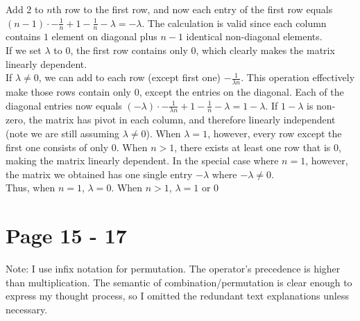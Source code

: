 \documentclass{article}
\begin{document}
Add $2$ to $n$th row to the first row, and now each entry of the first row equals $(n-1)\cdot -\frac{1}{n} + 1- \frac{1}{n}-\lambda=-\lambda$. The calculation is valid since each column contains $1$ element on diagonal plus $n-1$ identical non-diagonal elements.\\

If we set $\lambda$ to $0$, the first row contains only $0$, which clearly makes the matrix linearly dependent.\\

If $\lambda \neq 0$, we can add to each row (except first one) $-\frac{1}{\lambda n}$. This operation effectively make those rows contain only $0$, except the entries on the diagonal. Each of the diagonal entries now equals $(-\lambda)\cdot-\frac{1}{\lambda n} + 1 - \frac{1}{n} - \lambda = 1-\lambda$. If $1-\lambda$ is non-zero, the matrix has pivot in each column, and therefore linearly independent (note we are still assuming $\lambda \neq 0$). When $\lambda = 1$, however, every row except the first one consists of only $0$. When $n > 1$, there exists at least one row that is $0$, making the matrix linearly dependent. In the special case where $n=1$, however, the matrix we obtained has one single entry $-\lambda$ where $-\lambda \neq 0$.\\

Thus, when $n = 1$, $\lambda = 0$. When $n > 1$, $\lambda = 1$ or $0$

\section*{Page 15 - 17}
Note: I use infix notation for permutation. The operator's precedence is higher than multiplication. The semantic of combination/permutation is clear enough to express my thought process, so I omitted the redundant text explanations unless necessary.
\end{document}

